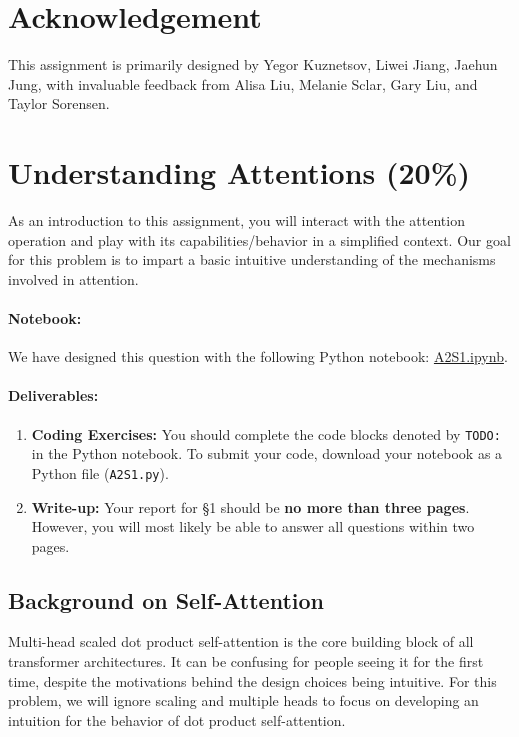 \documentclass{article}
\begin{document}
\section*{Acknowledgement}

This assignment is primarily designed by Yegor Kuznetsov, Liwei Jiang, Jaehun
Jung, with invaluable feedback from Alisa Liu, Melanie Sclar, Gary Liu, and
Taylor Sorensen.

\newpage

\section{Understanding Attentions (20\%)}

As an introduction to this assignment, you will interact with the attention
operation and play with its capabilities/behavior in a simplified context. Our
goal for this problem is to impart a basic intuitive understanding of the
mechanisms involved in attention.

\paragraph{Notebook:}
We have designed this question with the following Python notebook:
\textcolor{blue}{\href{https://colab.research.google.com/drive/1AaH9QTClxfF5T7RVW5FlhsegxhM3-rG8?usp=sharing}{A2S1.ipynb}}. 

\paragraph{Deliverables:} 

\begin{enumerate}
\item \textbf{Coding Exercises:} You should complete the code blocks denoted by
\texttt{TODO:} in the Python notebook. To submit your code, download your
notebook as a Python file (\verb|A2S1.py|).
\item \textbf{Write-up:} Your report for \S 1 should be \textbf{no more than
three pages}. However, you will most likely be able to answer all questions
within two pages.
\end{enumerate}


\subsection{Background on Self-Attention}

Multi-head scaled dot product self-attention is the core building block of all
transformer architectures. It can be confusing for people seeing it for the
first time, despite the motivations behind the design choices being  intuitive.
For this problem, we will ignore scaling and multiple heads to focus on
developing an intuition for the behavior of dot product self-attention.
\end{document}
